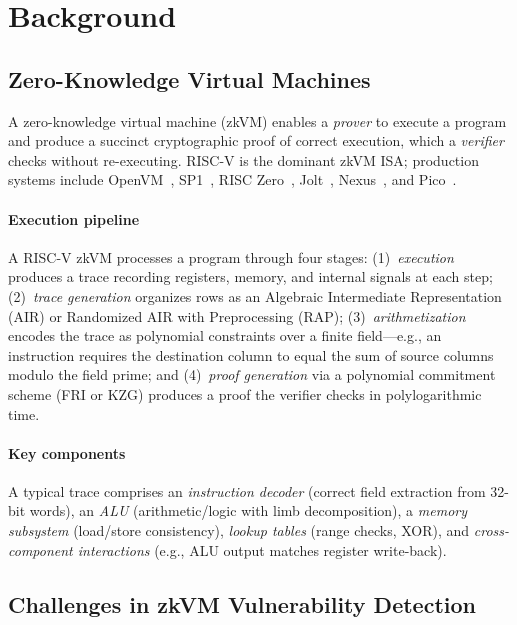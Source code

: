 \section{Background}\label{sec:background}

\subsection{Zero-Knowledge Virtual Machines}\label{sec:bg-zkvm}

A zero-knowledge virtual machine (zkVM) enables a \emph{prover} to execute a program and produce a succinct cryptographic proof of correct execution, which a \emph{verifier} checks without re-executing. RISC-V is the dominant zkVM ISA; production systems include OpenVM~\cite{openvm}, SP1~\cite{sp1}, RISC Zero~\cite{risc0}, Jolt~\cite{jolt}, Nexus~\cite{nexus}, and Pico~\cite{pico}.

\paragraph{Execution pipeline}
A RISC-V zkVM processes a program through four stages: (1)~\emph{execution} produces a trace recording registers, memory, and internal signals at each step; (2)~\emph{trace generation} organizes rows as an Algebraic Intermediate Representation (AIR) or Randomized AIR with Preprocessing (RAP); (3)~\emph{arithmetization} encodes the trace as polynomial constraints over a finite field---e.g., an  instruction requires the destination column to equal the sum of source columns modulo the field prime; and (4)~\emph{proof generation} via a polynomial commitment scheme (FRI or KZG) produces a proof the verifier checks in polylogarithmic time.

\paragraph{Key components}
A typical trace comprises an \emph{instruction decoder} (correct field extraction from 32-bit words), an \emph{ALU} (arithmetic/logic with limb decomposition), a \emph{memory subsystem} (load/store consistency), \emph{lookup tables} (range checks, XOR), and \emph{cross-component interactions} (e.g., ALU output matches register write-back).

\subsection{Challenges in zkVM Vulnerability Detection}\label{sec:bg-challenges}

